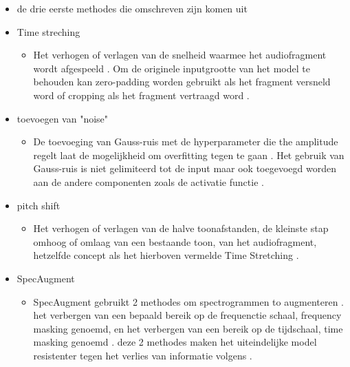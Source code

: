 \documentclass{hogent-article}
\begin{document}
\begin{itemize}
	\item de drie eerste methodes die omschreven zijn komen uit \cite{Wei_2020}
	
	\item Time streching
	\bigbreak 
	\begin{itemize}
		\item Het verhogen of verlagen van de snelheid waarmee het audiofragment wordt afgespeeld .
		Om de originele inputgrootte van het model te behouden kan zero-padding worden gebruikt als het fragment versneld word of cropping als het fragment vertraagd word .
		 
	\end{itemize}
	\bigbreak
	\item toevoegen van "noise"
	\bigbreak
	\begin{itemize}
		\item De toevoeging van Gauss-ruis met de hyperparameter die the amplitude regelt laat de mogelijkheid om overfitting tegen te gaan . Het gebruik van Gauss-ruis is niet gelimiteerd tot de input maar ook toegevoegd worden aan de andere componenten zoals de activatie functie .
	\end{itemize}
	\bigbreak
	\item pitch shift
	\bigbreak 
	\begin{itemize}
		\item Het verhogen of verlagen van de halve toonafstanden, de kleinste stap omhoog of omlaag van een bestaande toon,  van het audiofragment, hetzelfde concept als het hierboven vermelde Time Stretching  .
			
	\end{itemize}
	\bigbreak

	\item SpecAugment
	\bigbreak
	\begin{itemize}
		\item SpecAugment gebruikt 2 methodes om spectrogrammen to augmenteren .
		het verbergen van een bepaald bereik op de frequenctie schaal, frequency masking genoemd, en het verbergen van een bereik op de tijdschaal, time masking genoemd .
		deze 2 methodes maken het uiteindelijke model resistenter tegen het verlies van informatie volgens \cite{Park_2019} . 
		
		
	\end{itemize}
\end{itemize}
\end{document}

